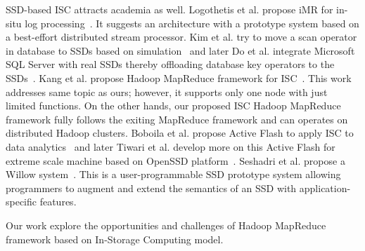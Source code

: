 SSD-based ISC attracts academia as well. Logothetis et al. propose iMR for in-situ log processing~\cite{iMR:ATC:2011}. It suggests an architecture with a prototype system based on a best-effort distributed stream processor. Kim et al. try to move a scan operator in database to SSDs based on simulation~\cite{OPCL:ADMS:2011} and later Do et al. integrate Microsoft SQL Server with real SSDs thereby offloading database key operators to the SSDs~\cite{SmartSSD:SIGMOD:2013}. Kang et al. propose Hadoop MapReduce framework for ISC~\cite{SmartSSDHadoop:MSST:2013}. This work addresses same topic as ours; however, it supports only one node with just limited functions. On the other hands, our proposed ISC Hadoop MapReduce framework fully follows the exiting MapReduce framework and can operates on distributed Hadoop clusters. Boboila et al. propose Active Flash to apply ISC to data analytics~\cite{ActiveFlash:MSST:2012} and later Tiwari et al. develop more on this Active Flash for extreme scale machine based on OpenSSD platform~\cite{ActivFlash:FAST:2013,Jasmine:OpenSSD}.
Seshadri et al. propose a Willow system~\cite{Willow:OSDI:2014}. This is a user-programmable SSD prototype system allowing programmers to augment and extend the semantics of an SSD with application-specific features.

Our work explore the opportunities and challenges of Hadoop MapReduce framework based on In-Storage Computing model.



